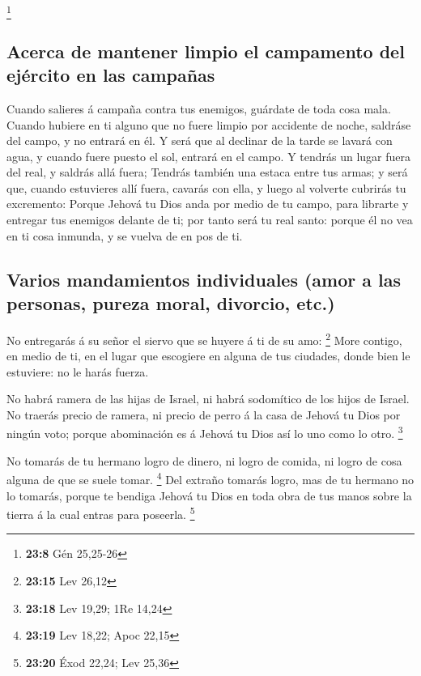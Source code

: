 \footnote{\textbf{23:8} Gén 25,25-26}

\hypertarget{acerca-de-mantener-limpio-el-campamento-del-ejuxe9rcito-en-las-campauxf1as}{%
\subsection{Acerca de mantener limpio el campamento del ejército en las
campañas}\label{acerca-de-mantener-limpio-el-campamento-del-ejuxe9rcito-en-las-campauxf1as}}

 Cuando salieres á campaña contra tus enemigos, guárdate de
toda cosa mala.  Cuando hubiere en ti alguno que no fuere
limpio por accidente de noche, saldráse del campo, y no entrará en él.
 Y será que al declinar de la tarde se lavará con agua, y
cuando fuere puesto el sol, entrará en el campo.  Y tendrás
un lugar fuera del real, y saldrás allá fuera;  Tendrás
también una estaca entre tus armas; y será que, cuando estuvieres allí
fuera, cavarás con ella, y luego al volverte cubrirás tu excremento:
 Porque Jehová tu Dios anda por medio de tu campo, para
librarte y entregar tus enemigos delante de ti; por tanto será tu real
santo: porque él no vea en ti cosa inmunda, y se vuelva de en pos de ti.

\hypertarget{varios-mandamientos-individuales-amor-a-las-personas-pureza-moral-divorcio-etc.}{%
\subsection{Varios mandamientos individuales (amor a las personas,
pureza moral, divorcio,
etc.)}\label{varios-mandamientos-individuales-amor-a-las-personas-pureza-moral-divorcio-etc.}}

 No entregarás á su señor el siervo que se huyere á ti de
su amo: \footnote{\textbf{23:15} Lev 26,12}  More contigo,
en medio de ti, en el lugar que escogiere en alguna de tus ciudades,
donde bien le estuviere: no le harás fuerza.

 No habrá ramera de las hijas de Israel, ni habrá
sodomítico de los hijos de Israel.  No traerás precio de
ramera, ni precio de perro á la casa de Jehová tu Dios por ningún voto;
porque abominación es á Jehová tu Dios así lo uno como lo otro.
\footnote{\textbf{23:18} Lev 19,29; 1Re 14,24}

 No tomarás de tu hermano logro de dinero, ni logro de
comida, ni logro de cosa alguna de que se suele tomar. \footnote{\textbf{23:19}
  Lev 18,22; Apoc 22,15}  Del extraño tomarás logro, mas de
tu hermano no lo tomarás, porque te bendiga Jehová tu Dios en toda obra
de tus manos sobre la tierra á la cual entras para poseerla. \footnote{\textbf{23:20}
  Éxod 22,24; Lev 25,36}

